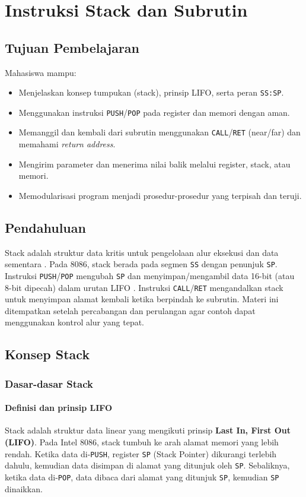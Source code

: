 \documentclass[../main.tex]{subfiles}
\begin{document}
\chapter{Instruksi Stack dan Subrutin}

    \section{Tujuan Pembelajaran}
        Mahasiswa mampu:
        \begin{itemize}
            \item Menjelaskan konsep tumpukan (stack), prinsip LIFO, serta peran \texttt{SS:SP}.
            \item Menggunakan instruksi \texttt{PUSH}/\texttt{POP} pada register dan memori dengan aman.
            \item Memanggil dan kembali dari subrutin menggunakan \texttt{CALL}/\texttt{RET} (near/far) dan memahami \textit{return address}.
            \item Mengirim parameter dan menerima nilai balik melalui register, stack, atau memori.
            \item Memodularisasi program menjadi prosedur-prosedur yang terpisah dan teruji.
        \end{itemize}

    \section{Pendahuluan}
        Stack adalah struktur data kritis untuk pengelolaan alur eksekusi dan data sementara \cite{tutorials_point_assembly}. Pada 8086, stack berada pada segmen \texttt{SS} dengan penunjuk \texttt{SP}. Instruksi \texttt{PUSH}/\texttt{POP} mengubah \texttt{SP} dan menyimpan/mengambil data 16-bit (atau 8-bit dipecah) dalam urutan LIFO \cite{8086_instruction_set_reference}. Instruksi \texttt{CALL}/\texttt{RET} mengandalkan stack untuk menyimpan alamat kembali ketika berpindah ke subrutin. Materi ini ditempatkan setelah percabangan dan perulangan agar contoh dapat menggunakan kontrol alur yang tepat.

    \section{Konsep Stack}
        \subsection{Dasar-dasar Stack}
            \subsubsection{Definisi dan prinsip LIFO}
                Stack adalah struktur data linear yang mengikuti prinsip \textbf{Last In, First Out (LIFO)}. Pada Intel 8086, stack tumbuh ke arah alamat memori yang lebih rendah. Ketika data di-\texttt{PUSH}, register \texttt{SP} (Stack Pointer) dikurangi terlebih dahulu, kemudian data disimpan di alamat yang ditunjuk oleh \texttt{SP}. Sebaliknya, ketika data di-\texttt{POP}, data dibaca dari alamat yang ditunjuk \texttt{SP}, kemudian \texttt{SP} dinaikkan.
\end{document}
